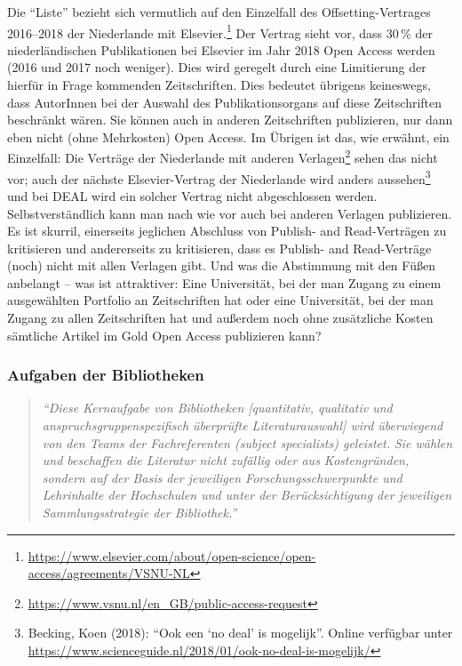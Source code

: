 \documentclass[a4paper,
fontsize=11pt,
oneside,
numbers=noperiodatend,
parskip=half-,
bibliography=totoc,
final
]{scrartcl}
\begin{document}
Die \enquote{Liste} bezieht sich vermutlich auf den Einzelfall des
Offsetting-Vertrages 2016--2018 der Niederlande mit Elsevier.\footnote{\url{https://www.elsevier.com/about/open-science/open-access/agreements/VSNU-NL}}
Der Vertrag sieht vor, dass 30\,\% der niederländischen Publikationen
bei Elsevier im Jahr 2018 Open Access werden (2016 und 2017 noch
weniger). Dies wird geregelt durch eine Limitierung der hierfür in Frage
kommenden Zeitschriften. Dies bedeutet übrigens keineswegs, dass
AutorInnen bei der Auswahl des Publikationsorgans auf diese
Zeitschriften beschränkt wären. Sie können auch in anderen Zeitschriften
publizieren, nur dann eben nicht (ohne Mehrkosten) Open Access. Im
Übrigen ist das, wie erwähnt, ein Einzelfall: Die Verträge der
Niederlande mit anderen Verlagen\footnote{\url{https://www.vsnu.nl/en_GB/public-access-request}}
sehen das nicht vor; auch der nächste Elsevier-Vertrag der Niederlande
wird anders aussehen\footnote{Becking, Koen (2018): \enquote{Ook een
  \enquote{no deal} is mogelijk}. Online verfügbar unter
  \url{https://www.scienceguide.nl/2018/01/ook-no-deal-is-mogelijk/}}
und bei DEAL wird ein solcher Vertrag nicht abgeschlossen werden.
Selbstverständlich kann man nach wie vor auch bei anderen Verlagen
publizieren. Es ist skurril, einerseits jeglichen Abschluss von Publish-
and Read-Verträgen zu kritisieren und andererseits zu kritisieren, dass
es Publish- and Read-Verträge (noch) nicht mit allen Verlagen gibt. Und
was die Abstimmung mit den Füßen anbelangt -- was ist attraktiver: Eine
Universität, bei der man Zugang zu einem ausgewählten Portfolio an
Zeitschriften hat oder eine Universität, bei der man Zugang zu allen
Zeitschriften hat und außerdem noch ohne zusätzliche Kosten sämtliche
Artikel im Gold Open Access publizieren kann?

\hypertarget{aufgaben-der-bibliotheken}{%
\subsubsection{Aufgaben der
Bibliotheken}\label{aufgaben-der-bibliotheken}}

\begin{quote}
\emph{\enquote{Diese Kernaufgabe von Bibliotheken {[}quantitativ,
qualitativ und anspruchsgruppenspezifisch überprüfte Literaturauswahl{]}
wird überwiegend von den Teams der Fachreferenten (subject specialists)
geleistet. Sie wählen und beschaffen die Literatur nicht zufällig oder
aus Kostengründen, sondern auf der Basis der jeweiligen
Forschungsschwerpunkte und Lehrinhalte der Hochschulen und unter der
Berücksichtigung der jeweiligen Sammlungsstrategie der Bibliothek.}}
\end{quote}
\end{document}
